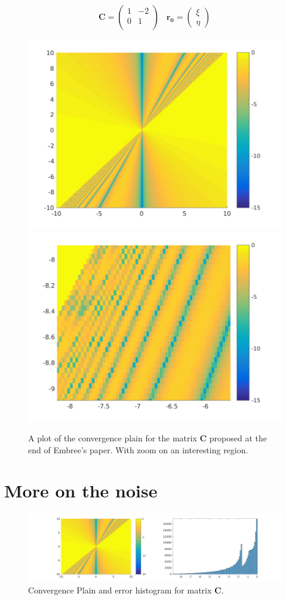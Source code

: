 \begin{frame}
 \begin{equation}
 \mathbf{C} = \begin{pmatrix}
 1 & -2 \\
 0 & 1 \\
 \end{pmatrix}
 \;\;\;
 \mathbf{r_0} = \begin{pmatrix} \xi \\ \eta \end{pmatrix}
 \end{equation}
\end{frame}

\begin{frame}
\begin{figure}
\centering
\includegraphics[width=0.45\linewidth]{../images/twoDPaper}
\includegraphics[width=0.45\linewidth]{../images/twoDZoom}
\caption{A plot of the convergence plain for the matrix $\mathbf{C}$ proposed at the end of Embree's paper. With zoom on an interesting region.}
\label{fig:twoDZoom}
\end{figure}
\end{frame}

\section{More on the noise}
\begin{frame}
\begin{figure}
\centering
\includegraphics[width=1\linewidth]{../images/gmresCHist}
\caption{Convergence Plain and error histogram for matrix $\mathbf{C}$.}
\end{figure}
\end{frame}


